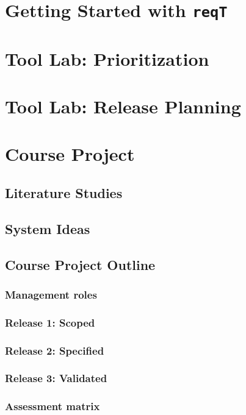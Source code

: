 \documentclass{reqengbook}
\begin{document}
\chapter{Getting Started with \texttt{reqT}}

\chapter{Tool Lab: Prioritization}

\chapter{Tool Lab: Release Planning}

\chapter{Course Project}

\section{Literature Studies}

\section{System Ideas}

\section{Course Project Outline}
\subsection{Management roles}
\subsection{Release 1: Scoped}
\subsection{Release 2: Specified}
\subsection{Release 3: Validated}

\newpage
\subsection{Assessment matrix}
\end{document}
